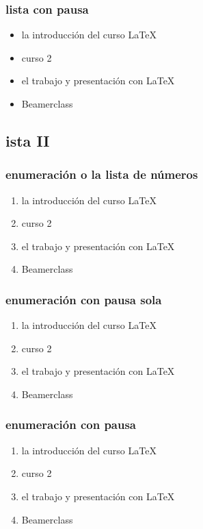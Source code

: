\documentclass[hyperref={pdfpagelabels=false}]{beamer}
\begin{document}
\begin{frame}
\frametitle{lista con pausa}
\begin{itemize}[<+->]
\item la introducci\'on del curso  \LaTeX{}  
\item curso 2  
\item el trabajo y presentaci\'on con  \LaTeX{} 
\item Beamerclass 
\end{itemize} 
\end{frame}




\subsection{ista II}

\begin{frame}
\frametitle{enumeraci\'on o la lista de n\'umeros }
\begin{enumerate}
\item la introducci\'on del curso  \LaTeX{}  
\item curso 2  
\item el trabajo y presentaci\'on con  \LaTeX{} 
\item Beamerclass 
\end{enumerate}
\end{frame}

\begin{frame}
\frametitle{enumeraci\'on con pausa sola}
\begin{enumerate}
\item la introducci\'on del curso  \LaTeX{}  \pause 
\item curso 2  \pause 
\item el trabajo y presentaci\'on con  \LaTeX{} \pause 
\item Beamerclass 
\end{enumerate}
\end{frame}

\begin{frame}
\frametitle{enumeraci\'on con pausa}
\begin{enumerate}[<+->]
\item la introducci\'on del curso  \LaTeX{}  
\item curso 2  
\item el trabajo y presentaci\'on con  \LaTeX{} 
\item Beamerclass 
\end{enumerate}
\end{frame}
\end{document}
